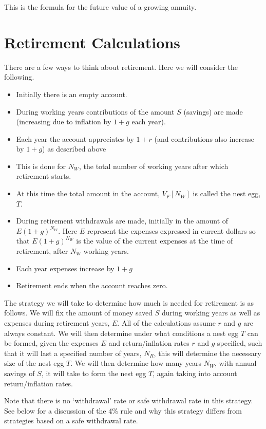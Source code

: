 \documentclass[12pt]{article}
\begin{document}
This is the formula for the future value of a growing annuity.

\section{Retirement Calculations}

There are a few ways to think about retirement. 
Here we will consider the following.
\begin{itemize}
\item{Initially there is an empty account.}
\item{During working years contributions of the amount $S$ (savings) are made (increasing due to inflation by $1+g$ each year).}
\item{Each year the account appreciates by $1+r$ (and contributions also increase by $1+g$) as described above} 
\item{This is done for $N_W$, the total number of working years after which retirement starts.}
\item{At this time the total amount in the account, $V_F[N_W]$ is called the nest egg, $T$.}
\item{During retirement withdrawals are made, initially in the amount of $E(1+g)^{N_W}$.
Here $E$ represent the expenses expressed in current dollars so that $E(1+g)^{N_W}$ is the value of the current expenses at the time of retirement, after $N_W$ working years.}
\item{Each year expenses increase by $1+g$}
\item{Retirement ends when the account reaches zero.}
\end{itemize}

The strategy we will take to determine how much is needed for retirement is as follows. 
We will fix the amount of money saved $S$ during working years as well as expenses during retirement years, $E$.
All of the calculations assume $r$ and $g$ are always constant.
We will then determine under what conditions a nest egg $T$ can be formed, given the expenses $E$ and return/inflation rates $r$ and $g$ specified, such that it will last a specified number of years, $N_R$, this will determine the necessary size of the nest egg $T$.
We will then determine how many years $N_W$, with annual savings of $S$, it will take to form the nest egg $T$, again taking into account return/inflation rates.

Note that there is no `withdrawal' rate or safe withdrawal rate in this strategy.
See below for a discussion of the 4\% rule and why this strategy differs from strategies based on a safe withdrawal rate.
\end{document}
